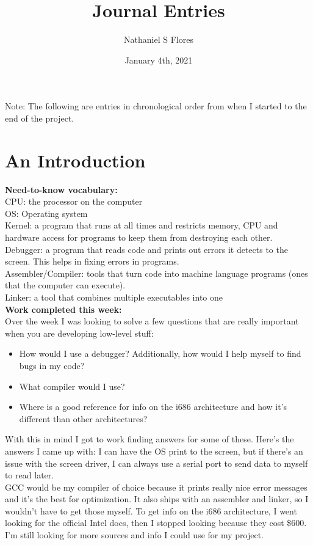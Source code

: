 \documentclass[11pt]{article}
\title{\textbf{Journal Entries}}
\author{Nathaniel S Flores}
\date{January 4th, 2021}
\begin{document}
\maketitle
{}
\tableofcontents
\newpage
{}
Note: The following are entries in chronological order from when I started to the end of the project. 
\section{An Introduction}
\textbf{Need-to-know vocabulary:}\\
CPU: the processor on the computer\\
OS: Operating system\\
Kernel: a program that runs at all times and restricts memory, CPU and hardware access for programs to keep them from destroying each other.\\
Debugger: a program that reads code and prints out errors it detects to the screen. This helps in fixing errors in programs.\\
Assembler/Compiler: tools that turn code into machine language programs (ones that the computer can execute). \\
Linker: a tool that combines multiple executables into one\\
\textbf{Work completed this week:}\\
Over the week I was looking to solve a few questions that are really important when you are developing low-level stuff:
\begin{itemize}
\item How would I use a debugger? Additionally, how would I help myself to find bugs in my code?
\item What compiler would I use?
\item Where is a good reference for info on the i686 architecture and how it's different than other architectures?
\end{itemize}
With this in mind I got to work finding answers for some of these. Here's the answers I came up with:
I can have the OS print to the screen, but if there's an issue with the screen driver, I can always use a serial port to send data to myself to read later.\\
GCC would be my compiler of choice because it prints really nice error messages and it's the best for optimization. It also ships with an assembler and linker, so I wouldn't have to get those myself.
To get info on the i686 architecture, I went looking for the official Intel docs, then I stopped looking because they cost \$600. I'm still looking for more sources and info I could use for my project.\\
\end{document}
